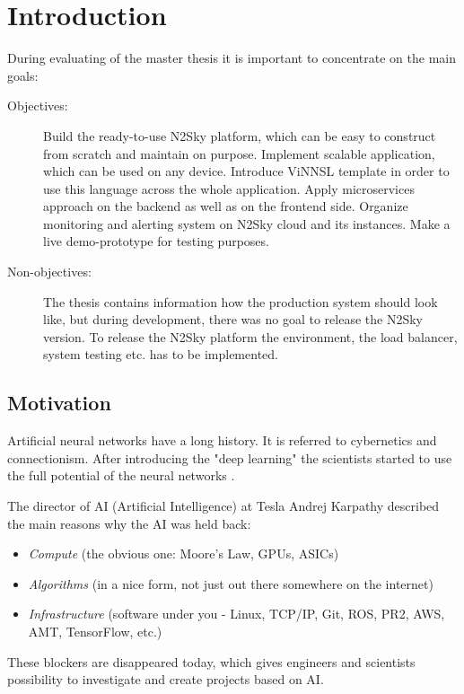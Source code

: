 \section{Introduction}\label{introduction}

During evaluating of the master thesis it is important to concentrate on the main goals: 

\begin{description}
\item[Objectives:] Build the ready-to-use N2Sky platform, which can be easy to construct from scratch and maintain on purpose. Implement scalable application, which can be used on any device. Introduce ViNNSL template in order to use this language across the whole application. Apply microservices approach on the backend as well as on the frontend side. Organize monitoring and alerting system on N2Sky cloud and its instances. Make a live demo-prototype for testing purposes. 
\item[Non-objectives:] The thesis contains information how the production system should look like, but during development, there was no goal to release the N2Sky version. To release the N2Sky platform the environment, the load balancer, system testing etc. has to be implemented. 
\end{description}

\subsection{Motivation}\label{motivation}

Artificial neural networks have a long history. It is referred to cybernetics and connectionism.  After introducing the "deep learning"  the scientists started to use the full potential of the neural networks \cite{Goodfellow}. 

The director of AI (Artificial Intelligence) at Tesla Andrej Karpathy described the main reasons why the AI was held back:

\begin{itemize}
\item \emph{Compute} (the obvious one: Moore's Law, GPUs, ASICs)
\item \emph{Algorithms} (in a nice form, not just out there somewhere on the internet)
\item \emph{Infrastructure}  (software under you - Linux, TCP/IP, Git, ROS, PR2, AWS, AMT, TensorFlow, etc.) \cite{andrej}
\end{itemize}

These blockers are disappeared today, which gives engineers and scientists possibility to investigate and create projects based on AI. 

